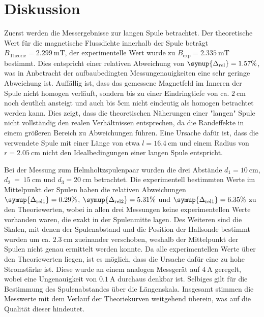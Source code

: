 \section{Diskussion}
\label{sec:Diskussion}
Zuerst werden die Messergebnisse zur langen Spule betrachtet. Der theoretische Wert für die magnetische Flussdichte innerhalb der Spule beträgt 
$B_{\text{Theorie}} = 2.299\:\unit{\milli\tesla}$, der experimentelle Wert wurde zu $B_{\text{exp}} = 2.335\:\unit{\milli\tesla}$ bestimmt. 
Dies entspricht einer relativen Abweichung von $\symup{\Delta_{\text{rel}}} = 1.57 \%$, was in Anbetracht der aufbaubedingten Messungenauigkeiten 
eine sehr geringe Abweichung ist. Auffällig ist, dass das gemessene Magnetfeld im Inneren der Spule nicht homogen verläuft, sondern bis zu einer Eindringtiefe von
ca. $2 \: \unit{\centi\metre}$ noch deutlich ansteigt und auch bis $5 \unit{\centi\metre}$ nicht eindeutig als homogen betrachtet werden kann.
Dies zeigt, dass die theoretischen Näherungen einer "langen"\: Spule nicht vollständig den realen Verhältnissen entsprechen, da die Randeffekte in einem größeren
Bereich zu Abweichungen führen. Eine Ursache dafür ist, dass die verwendete Spule mit einer Länge von etwa $l = 16.4\: \unit{\centi\metre}$ und einem Radius von 
$r = 2.05 \: \unit{\centi\metre}$ nicht den Idealbedingungen einer langen Spule entspricht.


Bei der Messung zum Helmholtzspulenpaar wurden die drei Abstände $d_1 = 10\: \unit{\centi\metre}$, $d_2~=~15\: \unit{\centi\metre}$
und $d_3 = 20\: \unit{\centi\metre}$ betrachtet. Die experimentell bestimmten Werte im Mittelpunkt der Spulen haben die relativen Abweichungen 
$\symup{\Delta_{\text{rel}1}} = 0.29 \%$, $\symup{\Delta_{\text{rel}2}} = 5.31\%$ und $\symup{\Delta_{\text{rel}1}} = 6.35 \%$ zu den Theoriewerten, wobei in allen 
drei Messungen keine experimentellen Werte vorhanden waren, die exakt in der Spulenmitte lagen. Des Weiteren sind die Skalen, mit denen der Spulenabstand und die 
Position der Hallsonde bestimmt wurden um ca. $2.3\: \unit{\centi\metre}$ zueinander verschoben, weshalb der Mittelpunkt der Spulen nicht genau ermittelt werden konnte.
Da alle experimentellen Werte über den Theoriewerten liegen, ist es möglich, dass die Ursache dafür eine zu hohe Stromstärke ist. Diese wurde an einem
analogen Messgerät auf $4 \: \unit{\ampere}$ geregelt, wobei eine Ungenauigkeit von $0.1 \: \unit{\ampere}$ durchaus denkbar ist. Selbiges gilt für die Bestimmung des
Spulenabstandes über die Längenskala. Insgesamt stimmen die Messwerte mit dem Verlauf der Theoriekurven weitgehend überein, was auf die Qualität dieser hindeutet.


